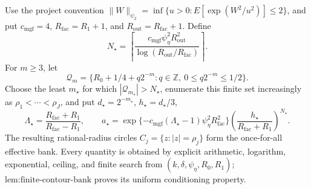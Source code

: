 Use the project convention \(\|W\|_{\psi_2}=\inf\{u>0:E[\exp(W^2/u^2)]\le2\}\), and put \(c_{\mathrm{mgf}}=4\), \(R_{\mathrm{fac}}=R_1+1\), and \(R_{\mathrm{out}}=R_{\mathrm{fac}}+1\).  Define
\[
 N_{\star}=\left\lceil\frac{c_{\mathrm{mgf}}\psi_{\eta}^2R_{\mathrm{out}}^2}{\log(R_{\mathrm{out}}/R_{\mathrm{fac}})}\right\rceil.
\]
For \(m\ge3\), let
\[
 \mathcal Q_m=\{R_0+1/4+q2^{-m}:q\in\mathbb Z,\ 0\le q2^{-m}\le1/2\}.
\]
Choose the least \(m_{\star}\) for which \(|\mathcal Q_{m_{\star}}|>N_{\star}\), enumerate this finite set increasingly as \(\rho_1<\cdots<\rho_J\), and put \(d_{\star}=2^{-m_{\star}}\), \(h_{\star}=d_{\star}/3\),
\[
 \Lambda_{\star}=\frac{R_{\mathrm{fac}}+R_1}{R_{\mathrm{fac}}-R_1},
 \qquad
 a_{\star}=\exp\{-c_{\mathrm{mgf}}(\Lambda_{\star}-1)\psi_{\eta}^2R_{\mathrm{fac}}^2\}
 \left(\frac{h_{\star}}{R_{\mathrm{fac}}+R_1}\right)^{N_{\star}}.
\]
The resulting rational-radius circles \(C_j=\{z:|z|=\rho_j\}\) form the once-for-all effective bank.  Every quantity is obtained by explicit arithmetic, logarithm, exponential, ceiling, and finite search from \((k,\delta,\psi_{\eta},R_0,R_1)\); \(\text{lem:finite-contour-bank}\) proves its uniform conditioning property.